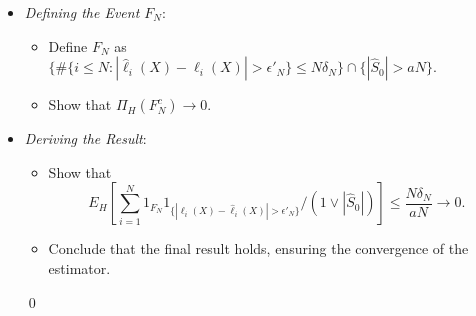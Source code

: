 \documentclass[10pt, aspectratio=169]{beamer}
\begin{document}


\begin{frame}
    \begin{itemize}[label=\scalebox{0.5}{$\bullet$}]
                \item \textit{Defining the Event \(F_N\)}:
            \begin{itemize}[label=\scalebox{0.5}{$\bullet$}]
                \setlength{\itemsep}{\baselineskip}
                \item Define \(F_N\) as \(\{ \#\{i \leq N : |\hat{\ell}_i(X) - \ell_i(X)| > \epsilon'_N\} \leq N \delta_N \} \cap \{ |\hat{S}_0| > aN \}\).
                \item Show that \( \Pi_{H}(F_N^c) \to 0 \).
            \end{itemize}

        \item \textit{Deriving the Result}:
            \begin{itemize}[label=\scalebox{0.5}{$\bullet$}]
                \setlength{\itemsep}{\baselineskip}
                \item Show that 
                \[
                E_{H} \left[ \sum_{i=1}^{N} 1_{F_N} 1_{\{|\ell_i(X) - \hat{\ell}_i(X)| > \epsilon'_N\}} \bigg/ (1 \vee |\hat{S}_0|) \right] \leq \frac{N \delta_N}{aN} \to 0.
                \]
                \item Conclude that the final result holds, ensuring the convergence of the estimator.
            \end{itemize} \qed
    \end{itemize}
\end{frame}
\end{document}
